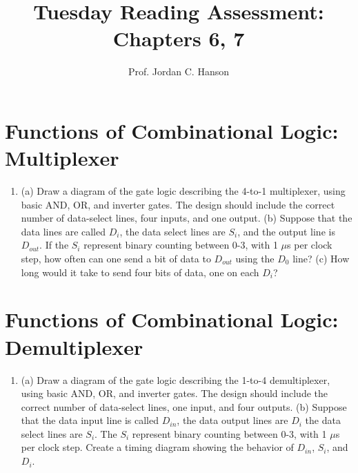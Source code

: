 \documentclass{article}
\begin{document}
\title{Tuesday Reading Assessment: Chapters 6, 7}
\author{Prof. Jordan C. Hanson}

\maketitle

\section{Functions of Combinational Logic: Multiplexer}

\begin{enumerate}
\item (a) Draw a diagram of the gate logic describing the 4-to-1 multiplexer, using basic AND, OR, and inverter gates. The design should include the correct number of data-select lines, four inputs, and one output.  (b) Suppose that the data lines are called $D_i$, the data select lines are $S_i$, and the output line is $D_{out}$.  If the $S_i$ represent binary counting between 0-3, with 1 $\mu$s per clock step, how often can one send a bit of data to $D_{out}$ using the $D_0$ line? (c) How long would it take to send four bits of data, one on each $D_i$? \\ \vspace{4cm}
\end{enumerate}

\section{Functions of Combinational Logic: Demultiplexer}

\begin{enumerate}
\item (a) Draw a diagram of the gate logic describing the 1-to-4 demultiplexer, using basic AND, OR, and inverter gates. The design should include the correct number of data-select lines, one input, and four outputs.  (b) Suppose that the data input line is called $D_{in}$, the data output lines are $D_i$ the data select lines are $S_i$.  The $S_i$ represent binary counting between 0-3, with 1 $\mu$s per clock step.  Create a timing diagram showing the behavior of $D_{in}$, $S_i$, and $D_i$.  \\ \vspace{4cm}
\end{enumerate}
\end{document}
